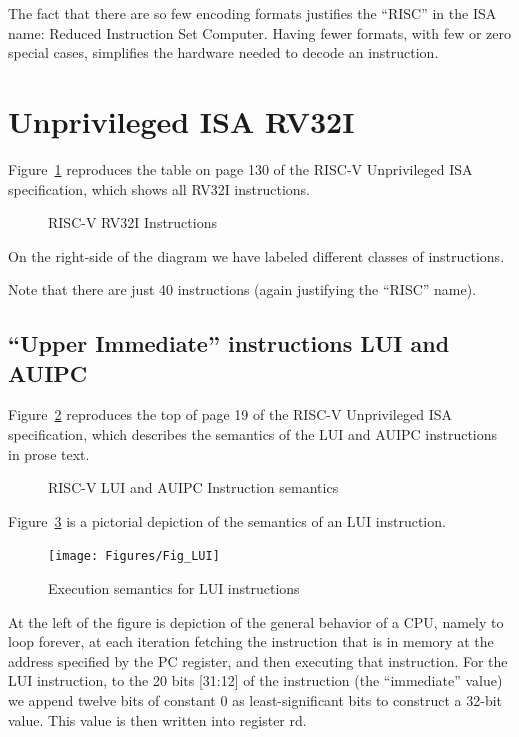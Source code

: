 The fact that there are so few encoding formats justifies the ``RISC''
in the ISA name: Reduced Instruction Set Computer.  Having fewer
formats, with few or zero special cases, simplifies the hardware
needed to decode an instruction.


\section{Unprivileged ISA RV32I}

\label{Sec_RV32I}


Figure~\ref{Fig_RV32I_labeled} reproduces the table on page 130 of the
RISC-V Unprivileged ISA specification, which shows all RV32I
instructions.
\begin{figure}[htbp]
  \centerline{}
  \caption{\label{Fig_RV32I_labeled} RISC-V RV32I Instructions}
\end{figure}
On the right-side of the diagram we have labeled different classes of
instructions.

Note that there are just 40 instructions (again justifying the ``RISC'' name).


\subsection{``Upper Immediate'' instructions LUI and AUIPC}

Figure~\ref{Fig_LUI_AUIPC} reproduces the top of page 19 of the RISC-V
Unprivileged ISA specification, which describes the semantics of the
LUI and AUIPC instructions in prose text.
\begin{figure}[htbp]
  \centerline{}
  \caption{\label{Fig_LUI_AUIPC} RISC-V LUI and AUIPC Instruction semantics}
\end{figure}

Figure~\ref{Fig_LUI} is a pictorial depiction of the semantics of an LUI instruction.
\begin{figure}[htbp]
  \centerline{\texttt{[image: Figures/Fig\_LUI]}}
  \caption{\label{Fig_LUI} Execution semantics for LUI instructions}
\end{figure}
At the left of the figure is depiction of the general behavior of a
CPU, namely to loop forever, at each iteration fetching the
instruction that is in memory at the address specified by the PC
register, and then executing that instruction.  For the LUI
instruction, to the 20 bits [31:12] of the instruction (the
``immediate'' value) we append twelve bits of constant 0 as
least-significant bits to construct a 32-bit value.  This value is
then written into register rd.

